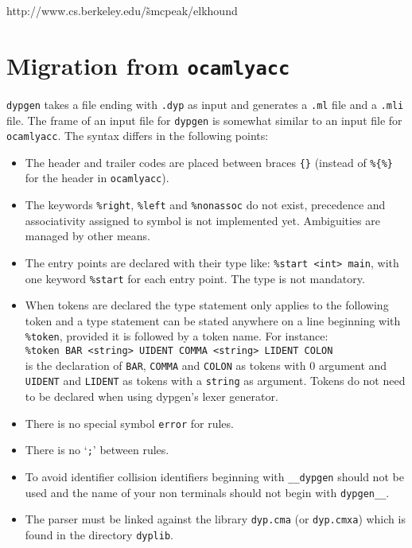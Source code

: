 \documentclass[12pt]{article}
\begin{document}
{http://www.cs.berkeley.edu/\~smcpeak/elkhound\\

\section{Migration from \texttt{ocamlyacc}}

\texttt{dypgen} takes a file ending with \texttt{.dyp} as input and generates a \texttt{.ml} file and a \texttt{.mli} file. The frame of an input file for \texttt{dypgen} is somewhat similar to an input file for \texttt{ocamlyacc}. The syntax differs in the following points:
\begin{itemize}
\item The header and trailer codes are placed between braces \texttt{\{\}} (instead of \texttt{\%\{\%\}} for the header in \texttt{ocamlyacc}).
\item The keywords \texttt{\%right}, \texttt{\%left} and \texttt{\%nonassoc} do not exist, precedence and associativity assigned to symbol is not implemented yet. Ambiguities are managed by other means.
\item The entry points are declared with their type like: \texttt{\%start <int> main}, with one keyword \texttt{\%start} for each entry point. The type is not mandatory.
\item When tokens are declared the type statement only applies to the following token and a type statement can be stated anywhere on a line beginning with \texttt{\%token}, provided it is followed by a token name. For instance:\\
\texttt{\%token BAR <string> UIDENT COMMA <string> LIDENT COLON}\\
is the declaration of \texttt{BAR}, \texttt{COMMA} and \texttt{COLON} as tokens with 0 argument and \texttt{UIDENT} and \texttt{LIDENT} as tokens with a \texttt{string} as argument. Tokens do not need to be declared when using dypgen's lexer generator.
\item There is no special symbol \texttt{error} for rules.
\item There is no `\texttt{;}' between rules.
\item To avoid identifier collision identifiers beginning with \verb|__dypgen| should not be used and the name of your non terminals should not begin with \verb|dypgen__|.
\item The parser must be linked against the library \texttt{dyp.cma} (or \texttt{dyp.cmxa}) which is found in the directory \texttt{dyplib}.
\end{itemize}

}
\end{document}
